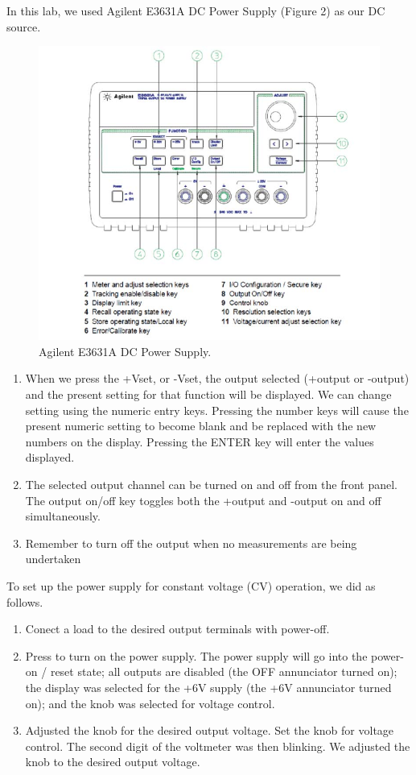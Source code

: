 \documentclass[a4paper]{report}
\begin{document}
	In this lab, we used Agilent E3631A DC Power Supply (Figure 2) as our DC source.
	\begin{figure}[H]
		\centering
		\includegraphics[width=0.8\linewidth]{2.jpg}
		\caption{Agilent E3631A DC Power Supply.}
	\end{figure}
	\begin{enumerate}
		\item When we press the +Vset, or -Vset, the output selected (+output or -output) and the present setting for that function will be displayed. We can change setting using the numeric entry keys. Pressing the number keys will cause the present numeric setting to become blank and be replaced with the new numbers on the display. Pressing the ENTER key will enter the values displayed.
		\item The selected output channel can be turned on and off from the front panel. The output on/off key toggles both the +output and -output on and off simultaneously.
		\item Remember to turn off the output when no measurements are being undertaken
	\end{enumerate}
	To set up the power supply for constant voltage (CV) operation, we did as follows.
	\begin{enumerate}
		\item Conect a load to the desired output terminals with power-off.
		\item Press to turn on the power supply. The power supply will go into the power-on / reset state; all outputs are disabled (the OFF annunciator turned on); the display was selected for the +6V supply (the +6V annunciator turned on); and the knob was selected for voltage control.
		\item Adjusted the knob for the desired output voltage. Set the knob for voltage control. The second digit of the voltmeter was then blinking. We adjusted the knob to the desired output voltage.
	\end{enumerate}
\end{document}
